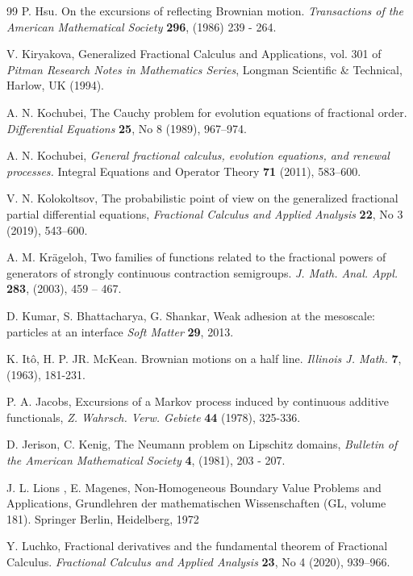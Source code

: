 \documentclass[11pt,a4paper]{article}
\newcommand{\magenta}{black}
\begin{document}
\begin{thebibliography}{99}
P. Hsu.
On the excursions of reflecting Brownian motion.
\textit{Transactions of the American Mathematical Society} {\bf 296}, (1986) 239 - 264.

V. Kiryakova,
Generalized Fractional Calculus and Applications, 
vol. 301 of \textit{Pitman Research Notes in Mathematics Series}, Longman Scientific \& Technical, Harlow, UK  (1994).


A. N. Kochubei,
The Cauchy problem for evolution equations of fractional order. 
\textit{Differential Equations} \textbf{25}, No 8 (1989), 967--974.

{A. N. Kochubei,} 
\textit{General fractional calculus, evolution equations, and renewal processes.} 
Integral Equations and Operator Theory \textbf{71} (2011), 583--600.

V. N. Kolokoltsov,
The probabilistic point of view on the generalized fractional partial differential equations, 
\textit{Fractional Calculus and Applied Analysis} \textbf{22}, No 3 (2019), 543--600.

A. M. Kr\"{a}geloh, 
Two families of functions related to the fractional powers of generators of strongly continuous contraction semigroups. 
\textit{J. Math. Anal. Appl.} \textbf{283}, (2003), 459 -- 467. 

D. Kumar, S. Bhattacharya, G. Shankar,
Weak adhesion at the mesoscale: particles at an interface
\textit{Soft Matter} {\bf 29}, 2013.

K. It\^{o}, H. P. JR. McKean.
Brownian motions on a half line. 
\textit{Illinois J. Math.} {\bf 7}, (1963), 181-231.

{\color{\magenta}
P. A. Jacobs,
Excursions of a Markov process induced by continuous additive functionals,
\textit{Z. Wahrsch. Verw. Gebiete} {\bf 44} (1978), 325-336.
}

D. Jerison, C. Kenig,
The Neumann problem on Lipschitz domains,
\emph{Bulletin of the American Mathematical Society} {\bf 4}, (1981), 203 - 207.  

J. L. Lions , E. Magenes,
Non-Homogeneous Boundary Value Problems and Applications,
Grundlehren der mathematischen Wissenschaften (GL, volume 181).
Springer Berlin, Heidelberg, 1972

Y. Luchko,
Fractional derivatives and the fundamental theorem of Fractional Calculus. 
\textit{Fractional Calculus and Applied Analysis} \textbf{23}, No 4 (2020), 939--966.



\end{thebibliography}
\end{document}
